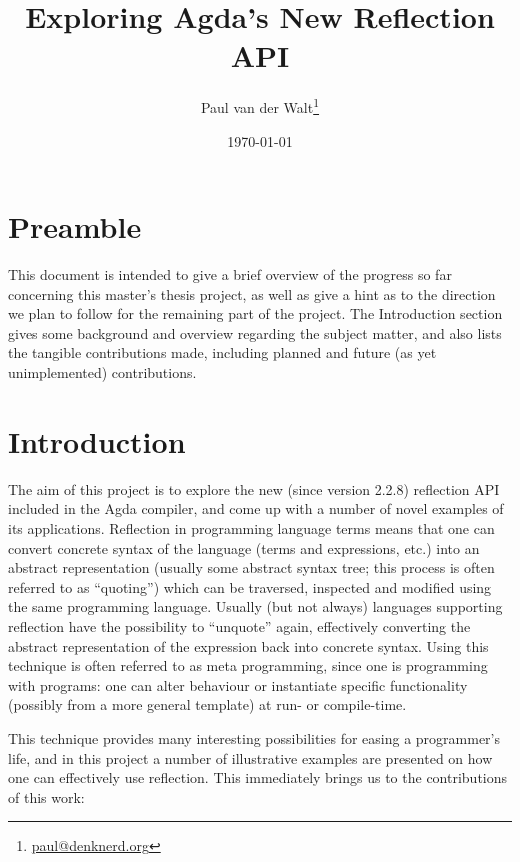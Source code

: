 \documentclass[a4paper]{article}
\author{Paul van der Walt\footnote{\url{paul@denknerd.org}}}
\date{\today}
\title{Exploring Agda's New Reflection API}
\begin{document}
\maketitle


\section{Preamble}

This document is intended to give a brief overview of the progress so far concerning
this master's thesis project, as well as give a hint as to the direction we plan to follow
for the remaining part of the project. The Introduction section gives some background and
overview regarding the subject matter, and also lists
the tangible contributions made, including planned and future (as yet unimplemented) contributions.


\section{Introduction}

The aim of this project is to explore the new (since version 2.2.8) reflection API included in the Agda
compiler, and come up with a number of novel examples of its applications. Reflection in programming language
terms means that one can convert concrete syntax of the language (terms and expressions, etc.) into an abstract
representation (usually some abstract syntax tree; this process is often referred to as ``quoting'')
which can be traversed, inspected and modified using the same programming
language. Usually (but not always) languages supporting reflection have the possibility to
``unquote'' again, effectively
converting the abstract representation of the expression back into concrete syntax. Using this technique is often referred to as meta programming,
since one is programming with programs: one can alter behaviour
or instantiate specific functionality (possibly from a more general template) at run- or compile-time.

This technique provides many interesting possibilities for easing a programmer's life, and in
this project a number of illustrative
examples are presented on how one can effectively use reflection. 
This immediately brings us to the contributions of this work:
\end{document}
